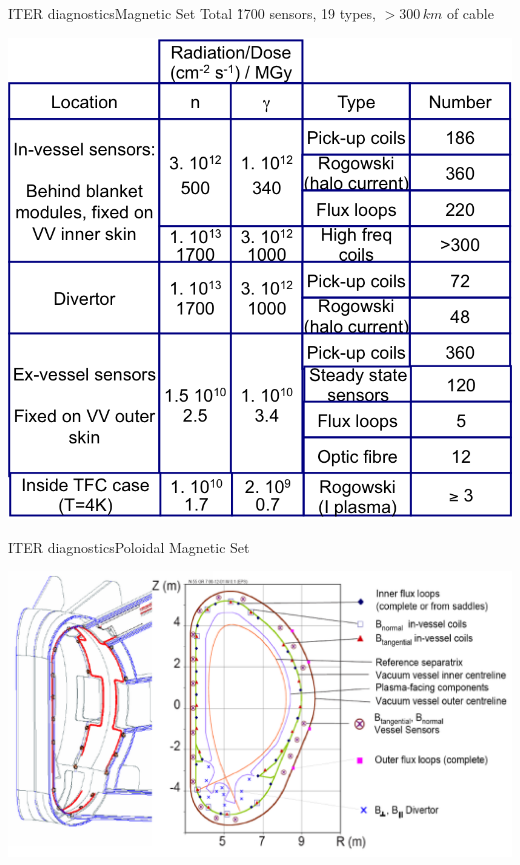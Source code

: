 \documentclass{beamer}
\begin{document}
\begin{frame}{ITER diagnostics}{Magnetic Set}
Total \~ 1700 sensors, 19 types,  $>300\,km$ of cable
	\begin{center}
		\includegraphics[width=0.7 \textheight]{tableIter.png}
	\end{center}
\end{frame}

\begin{frame}{ITER diagnostics}{Poloidal Magnetic Set}
	\begin{center}
		\includegraphics[height=0.8 \textheight]{poloidalIter.png}

	\end{center}
\end{frame}
\end{document}
